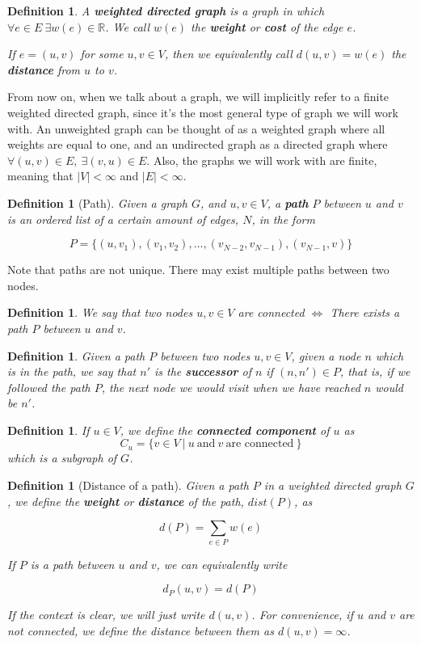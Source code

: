\documentclass[12pt]{report}
\newtheorem{definition}[theorem]{Definition}
\begin{document}
\begin{definition}
A \textbf{weighted directed graph} is a graph in which $\forall e \in E \ \exists w(e) \in \mathbb{R}$. We call $w(e)$ the \textbf{weight} or \textbf{cost} of the edge $e$.

If $e = (u, v)$ for some $u, v \in V$, then we equivalently call $d(u, v) = w(e)$ the \textbf{distance} from $u$ to $v$.
\end{definition}

From now on, when we talk about a graph, we will implicitly refer to a finite weighted directed graph, since it's the most general type of graph we will work with. An unweighted graph can be thought of as a weighted graph where all weights are equal to one, and an undirected graph as a directed graph where $\forall (u, v) \in E,\  \exists (v, u) \in E$. Also, the graphs we will work with are finite, meaning that $|V| < \infty$ and $|E| < \infty$.

\begin{definition}[Path]
Given a graph $G$, and $u, v \in V$, a \textbf{path} $P$ between $u$ and $v$ is an ordered list of a certain amount of edges, $N$, in the form

\[ P = \{(u,v_1), (v_1, v_2), \dots, (v_{N-2}, v_{N-1}), (v_{N-1}, v)\} \]
\end{definition}

Note that paths are not unique. There may exist multiple paths between two nodes.

\begin{definition}
We say that two nodes $u, v \in V$ are connected $\Longleftrightarrow$ There exists a path $P$ between $u$ and $v$.
\end{definition}

\begin{definition}
Given a path $P$ between two nodes $u, v \in V$, given a node $n$ which is in the path, we say that $n'$ is the \textbf{successor} of $n$ if $(n, n') \in P$, that is, if we followed the path $P$, the next node we would visit when we have reached $n$ would be $n'$.
\end{definition}

\begin{definition}
If $u \in V$, we define the \textbf{connected component} of $u$ as
\[ C_u = \{ v \in V\ |\ u \ \text{and} \ v \ \text{are connected}\  \} \]
which is a subgraph of $G$.
\end{definition}

\begin{definition}[Distance of a path]
Given a path $P$ in a weighted directed graph $G$, we define the \textbf{weight} or \textbf{distance} of the path, $dist(P)$, as

\[ d(P) = \sum_{e \in P} w(e) \]

If $P$ is a path between $u$ and $v$, we can equivalently write

\[ d_P(u, v) = d(P) \]

If the context is clear, we will just write $d(u, v)$. For convenience, if $u$ and $v$ are not connected, we define the distance between them as $d(u, v) = \infty$.
\end{definition}
\end{document}
